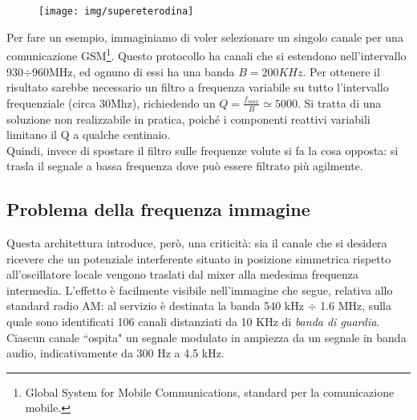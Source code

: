 \begin{figure}[hbt]
	\centering
	\texttt{[image: img/supereterodina]}
	\caption{}
	\label{fig:supereterodina}
\end{figure}


Per fare un esempio, immaginiamo di voler selezionare un singolo canale per una comunicazione GSM\footnote{Global System for Mobile Communications, standard per la comunicazione mobile.}. Questo protocollo ha canali che si estendono nell'intervallo 930$\div$960MHz, ed ognuno di essi ha una banda $B=200 KHz$. Per ottenere il risultato sarebbe necessario un filtro a frequenza variabile su tutto l'intervallo frequenziale (circa 30Mhz), richiedendo un $Q = \frac{f_{max}}{B} \simeq 5000$. Si tratta di una soluzione non realizzabile in pratica, poiché i componenti reattivi variabili limitano il Q a qualche centinaio.\\
Quindi, invece di spostare il filtro sulle frequenze volute si fa la cosa opposta: si trasla il segnale a bassa frequenza dove può essere filtrato più agilmente.

\subsection{Problema della frequenza immagine}
Questa architettura introduce, però, una criticità: sia il canale che si desidera ricevere che un potenziale interferente situato in posizione simmetrica rispetto all'oscillatore locale vengono traslati dal mixer alla medesima frequenza intermedia.
L'effetto è facilmente visibile nell'immagine che segue, relativa allo standard radio AM: al servizio è destinata la banda 540 kHz $\div$ 1.6 MHz, sulla quale sono identificati 106 canali distanziati da 10 KHz di \textit{banda di guardia}. Ciascun canale ``ospita" un segnale modulato in ampiezza da un segnale in banda audio, indicativamente da 300 Hz a 4.5 kHz.


